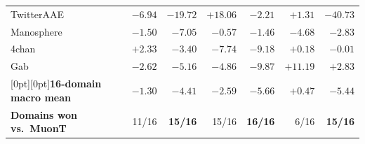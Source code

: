 \begin{table}[tbp]
\begin{tabularx}{\textwidth}{@{}>{\raggedright\arraybackslash}Xrrrrrr@{}}
TwitterAAE & $-6.94$ & $\mathbf{-19.72}$ & $+18.06$ & $\mathbf{-2.21}$ & $+1.31$ & $\mathbf{-40.73}$ \\
Manosphere & $-1.50$ & $\mathbf{-7.05}$ & $-0.57$ & $\mathbf{-1.46}$ & $\mathbf{-4.68}$ & $-2.83$ \\
4chan & $+2.33$ & $\mathbf{-3.40}$ & $-7.74$ & $\mathbf{-9.18}$ & $+0.18$ & $\mathbf{-0.01}$ \\
Gab & $-2.62$ & $\mathbf{-5.16}$ & $-4.86$ & $\mathbf{-9.87}$ & $+11.19$ & $\mathbf{+2.83}$ \\
\midrule
\rowcolor{rowtint}[0pt][0pt]\textbf{16-domain macro mean} & $-1.30$ & $\mathbf{-4.41}$ & $-2.59$ & $\mathbf{-5.66}$ & $+0.47$ & $\mathbf{-5.44}$ \\
\textbf{Domains won vs.\ MuonT} & 11/16 & \textbf{15/16} & 15/16 & \textbf{16/16} & 6/16 & \textbf{15/16} \\
\bottomrule\end{tabularx}
\end{table}
